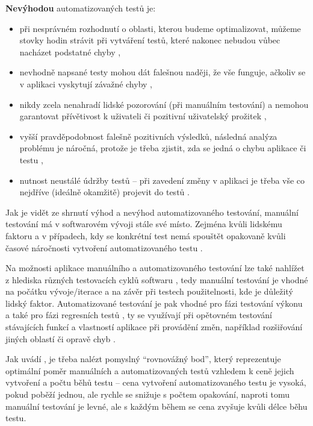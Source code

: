 \textbf{Nevýhodou} automatizovaných testů je:
\begin{itemize}
    \item při nesprávném rozhodnutí o oblasti, kterou budeme optimalizovat, můžeme stovky hodin strávit při vytváření testů, které nakonec nebudou vůbec nacházet podstatné chyby \cite{test-kitner},
    \item nevhodně napsané testy mohou dát falešnou naději, že vše funguje, ačkoliv se v aplikaci vyskytují závažné chyby \cite{test-devqa},
    \item nikdy zcela nenahradí lidské pozorování (při manuálním testování) a nemohou garantovat přívětivost k uživateli či pozitivní uživatelský prožitek \cite{test-genez},
    \item vyšší pravděpodobnost falešně pozitivních výsledků, následná analýza problému je náročná, protože je třeba zjistit, zda se jedná o chybu aplikace či testu \cite{test-perfecto},
    \item nutnost neustálé údržby testů -- při zavedení změny v aplikaci je třeba vše co nejdříve (ideálně okamžitě) projevit do testů \cite{test-swsrovnani}.
\end{itemize}

Jak je vidět ze shrnutí výhod a nevýhod automatizovaného testování, manuální testování má v softwarovém vývoji stále své místo. Zejména kvůli lidskému faktoru a v případech, kdy se konkrétní test nemá spouštět opakovaně kvůli časové náročnosti vytvoření automatizovaného testu \cite{test-bdo}.

Na možnosti aplikace manuálního a automatizovaného testování lze také nahlížet z hlediska různých testovacích cyklů softwaru \cite{test-bdo}, tedy manuální testování je vhodné na počátku vývoje/iterace a na závěr při testech použitelnosti, kde je důležitý lidský faktor. Automatizované testování je pak vhodné pro fázi testování výkonu a také pro fázi regresních testů \cite{test-bdo}, ty se využívají při opětovném testování stávajících funkcí a vlastností aplikace při provádění změn, například rozšiřování jiných oblastí či opravě chyb \cite{test-regresni}.

Jak uvádí \cite{test-bdo}, je třeba nalézt pomyslný \enquote{rovnovážný bod}, který reprezentuje optimální poměr manuálních a automatizovaných testů vzhledem k ceně jejich vytvoření a počtu běhů testu -- cena vytvoření automatizovaného testu je vysoká, pokud poběží jednou, ale rychle se snižuje s počtem opakování, naproti tomu manuální testování je levné, ale s každým během se cena zvyšuje kvůli délce běhu testu.

